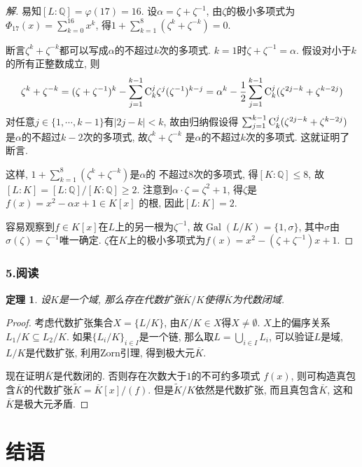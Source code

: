 \documentclass[12pt, a4paper, fontset=windows]{ctexart}
\newcommand{\Q}{\mathbb{Q}}
\newcommand{\Gal}{\operatorname{Gal}}
\newcommand{\abs}[1]{\left|{#1}\right|}
\newcommand{\cl}[1]{\overline{#1}} %
\newcommand{\yuedu}{{\normalsize 阅读}}
\newtheorem*{theorem}{定理}
\newenvironment{solution}{\begin{proof}[解]}{\end{proof}}
\begin{document}
\begin{solution}
易知$[L:\Q]=\varphi(17)=16$. 设$\alpha=\zeta+\zeta^{-1}$, 
由$\zeta$的极小多项式为$\Phi_{17}(x)=\sum^{16}_{k=0}x^k$, 
得$1+\sum^{8}_{k=1}(\zeta^k+\zeta^{-k})=0$. 

断言$\zeta^k+\zeta^{-k}$都可以写成$\alpha$的不超过$k$次的多项式. 
$k=1$时$\zeta+\zeta^{-1}=\alpha$. 假设对小于$k$的所有正整数成立, 则
\[\zeta^k+\zeta^{-k}=(\zeta+\zeta^{-1})^k-\sum^{k-1}_{j=1}{\rm C}^j_k\zeta^j(\zeta^{-1})^{k-j}=\alpha^k-\frac12\sum^{k-1}_{j=1}{\rm C}^j_k(\zeta^{2j-k}+\zeta^{k-2j})\]
对任意$j\in\{1,\cdots,k-1\}$有$\abs{2j-k}<k$, 故由归纳假设得
$\sum^{k-1}_{j=1}{\rm C}^j_k(\zeta^{2j-k}+\zeta^{k-2j})$
是$\alpha$的不超过$k-2$次的多项式, 故$\zeta^k+\zeta^{-k}$
是$\alpha$的不超过$k$次的多项式. 这就证明了断言. 

这样, $1+\sum^8_{k=1}(\zeta^k+\zeta^{-k})$是$\alpha$的
不超过$8$次的多项式, 得$[K:\Q]\le 8$, 故$[L:K]=[L:\Q]/[K:\Q]\ge 2$. 
注意到$\alpha\cdot\zeta=\zeta^2+1$, 得$\zeta$是$f(x)=x^2-\alpha x+1\in K[x]$
的根, 因此$[L:K]=2$. 

容易观察到$f\in K[x]$在$L$上的另一根为$\zeta^{-1}$, 
故$\Gal(L/K)=\{1,\sigma\}$, 其中$\sigma$由$\sigma(\zeta)=\zeta^{-1}$唯一确定. 
$\zeta$在$K$上的极小多项式为$f(x)=x^2-(\zeta+\zeta^{-1})x+1$. 
\end{solution}

\section*{5.\yuedu}

\begin{theorem}
设$K$是一个域, 那么存在代数扩张$\cl{K}/K$使得$\cl{K}$为代数闭域. 
\end{theorem}

\begin{proof}
考虑代数扩张集合$X=\{L/K\}$, 由$K/K\in X$得$X\ne\emptyset$. $X$上的偏序关系$L_1/K\subseteq L_2/K$. 
如果$\{L_i/K\}_{i\in I}$是一个链, 那么取$L=\bigcup_{i\in I}L_i$, 
可以验证$L$是域, $L/K$是代数扩张, 利用Zorn引理, 得到极大元$\cl{K}$. 

现在证明$\cl{K}$是代数闭的. 否则存在次数大于$1$的不可约多项式
$f(x)$, 则可构造真包含$\cl{K}$的代数扩张$\widetilde{K}=\cl{K}[x]/(f)$. 
但是$\widetilde{K}/K$依然是代数扩张, 而且真包含$\cl{K}$, 这和$\cl{K}$是极大元矛盾. 
\end{proof}

\clearpage
{}
\part*{结语}
\end{document}
